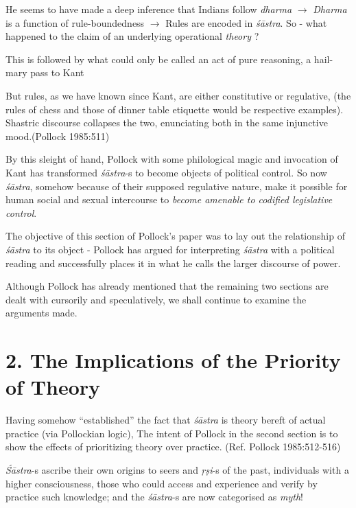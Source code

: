 He seems to have made a deep inference that Indians follow {\sl dharma} $\to$ {\sl Dharma} is a function of rule-boundedness $\to$ Rules are encoded in {\sl śāstra}. So - what happened to the claim of an underlying operational {\sl theory} ?

This is followed by what could only be called an act of pure reasoning, a hail-mary pass to Kant
\begin{myquote}
But rules, as we have known since Kant, are either constitutive or regulative, (the rules of chess and those of dinner table etiquette would be respective examples). Shastric discourse collapses the two, enunciating both in the same injunctive mood.\hfill (Pollock 1985:511)
\end{myquote}

By this sleight of hand, Pollock with some philological magic and invocation of Kant has transformed {\sl śāstra}-s to become objects of political control. So now {\sl śāstra}, somehow because of their supposed regulative nature, make it possible for human social and sexual intercourse to {\sl become amenable to codified legislative control}.

The objective of this section of Pollock's paper was to lay out the relationship of {\sl śāstra} to its object - Pollock has argued for interpreting {\sl śāstra} with a political reading and successfully places it in what he calls the larger discourse of power.

Although Pollock has already mentioned that the remaining two sections are dealt with cursorily and speculatively, we shall continue to examine the arguments made.

\section*{2. The Implications of the Priority of Theory}

Having somehow ``established'' the fact that {\sl śāstra} is theory bereft of actual practice (via Pollockian logic), The intent of Pollock in the second section is to show the effects of prioritizing theory over practice. (Ref. Pollock 1985:512-516)

{\sl Śāstra}-s ascribe their own origins to seers and {\sl ṛṣi}-s of the past, individuals with a higher consciousness, those who could access and experience and verify by practice such knowledge; and the {\sl śāstra}-s are now categorised as {\sl myth}!

